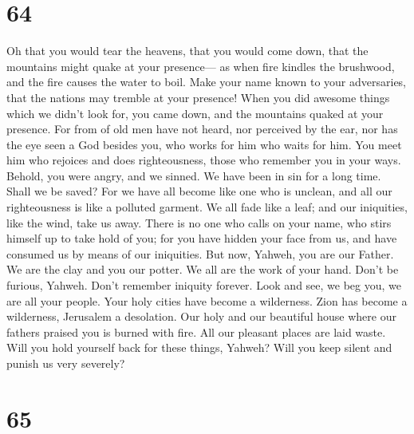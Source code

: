 \hypertarget{section-60}{%
\section{64}\label{section-60}}

 Oh that you would tear the heavens, that you would come
down, that the mountains might quake at your presence---  as
when fire kindles the brushwood, and the fire causes the water to boil.
Make your name known to your adversaries, that the nations may tremble
at your presence!  When you did awesome things which we
didn't look for, you came down, and the mountains quaked at your
presence.  For from of old men have not heard, nor perceived
by the ear, nor has the eye seen a God besides you, who works for him
who waits for him.  You meet him who rejoices and does
righteousness, those who remember you in your ways. Behold, you were
angry, and we sinned. We have been in sin for a long time. Shall we be
saved?  For we have all become like one who is unclean, and
all our righteousness is like a polluted garment. We all fade like a
leaf; and our iniquities, like the wind, take us away. 
There is no one who calls on your name, who stirs himself up to take
hold of you; for you have hidden your face from us, and have consumed us
by means of our iniquities.  But now, Yahweh, you are our
Father. We are the clay and you our potter. We all are the work of your
hand.  Don't be furious, Yahweh. Don't remember iniquity
forever. Look and see, we beg you, we are all your people. 
Your holy cities have become a wilderness. Zion has become a wilderness,
Jerusalem a desolation.  Our holy and our beautiful house
where our fathers praised you is burned with fire. All our pleasant
places are laid waste.  Will you hold yourself back for
these things, Yahweh? Will you keep silent and punish us very severely?

\hypertarget{section-61}{%
\section{65}\label{section-61}}

